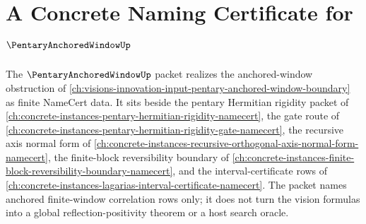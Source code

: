 \chapter{A Concrete Naming Certificate for $\PentaryAnchoredWindowUp$}
\label{ch:concrete-instances-pentary-anchored-window-namecert}

The $\PentaryAnchoredWindowUp$ packet realizes the anchored-window obstruction of \autoref{ch:visions-innovation-input-pentary-anchored-window-boundary} as finite NameCert data. It sits beside the pentary Hermitian rigidity packet of \autoref{ch:concrete-instances-pentary-hermitian-rigidity-namecert}, the gate route of \autoref{ch:concrete-instances-pentary-hermitian-rigidity-gate-namecert}, the recursive axis normal form of \autoref{ch:concrete-instances-recursive-orthogonal-axis-normal-form-namecert}, the finite-block reversibility boundary of \autoref{ch:concrete-instances-finite-block-reversibility-boundary-namecert}, and the interval-certificate rows of \autoref{ch:concrete-instances-lagarias-interval-certificate-namecert}. The packet names anchored finite-window correlation rows only; it does not turn the vision formulas into a global reflection-positivity theorem or a host search oracle.


